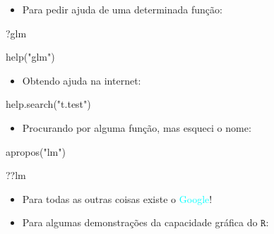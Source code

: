 \documentclass[
]{book}
\newenvironment{Shaded}{\begin{snugshade}}{\end{snugshade}}
\newcommand{\FunctionTok}[1]{\textcolor[rgb]{0.00,0.00,0.00}{#1}}
\newcommand{\NormalTok}[1]{#1}
\newcommand{\StringTok}[1]{\textcolor[rgb]{0.31,0.60,0.02}{#1}}
\providecommand{\tightlist}{%
  \setlength{\itemsep}{0pt}\setlength{\parskip}{0pt}}
\begin{document}
\begin{itemize}
\tightlist
\item
  Para pedir ajuda de uma determinada função:
\end{itemize}

\begin{Shaded}
\begin{Highlighting}[]
\NormalTok{?glm}
\end{Highlighting}
\end{Shaded}

\begin{Shaded}
\begin{Highlighting}[]
\FunctionTok{help}\NormalTok{(}\StringTok{"glm"}\NormalTok{)}
\end{Highlighting}
\end{Shaded}

\begin{itemize}
\tightlist
\item
  Obtendo ajuda na internet:
\end{itemize}

\begin{Shaded}
\begin{Highlighting}[]
\FunctionTok{help.search}\NormalTok{(}\StringTok{"t.test"}\NormalTok{)}
\end{Highlighting}
\end{Shaded}

\begin{itemize}
\tightlist
\item
  Procurando por alguma função, mas esqueci o nome:
\end{itemize}

\begin{Shaded}
\begin{Highlighting}[]
\FunctionTok{apropos}\NormalTok{(}\StringTok{"lm"}\NormalTok{)}
\end{Highlighting}
\end{Shaded}

\begin{Shaded}
\begin{Highlighting}[]
\NormalTok{??lm }
\end{Highlighting}
\end{Shaded}

\begin{itemize}
\tightlist
\item
  Para todas as outras coisas existe o \textcolor{cyan}{Google}!
\item
  Para algumas demonstrações da capacidade gráfica do \(\texttt{R}\):
\end{itemize}
\end{document}
